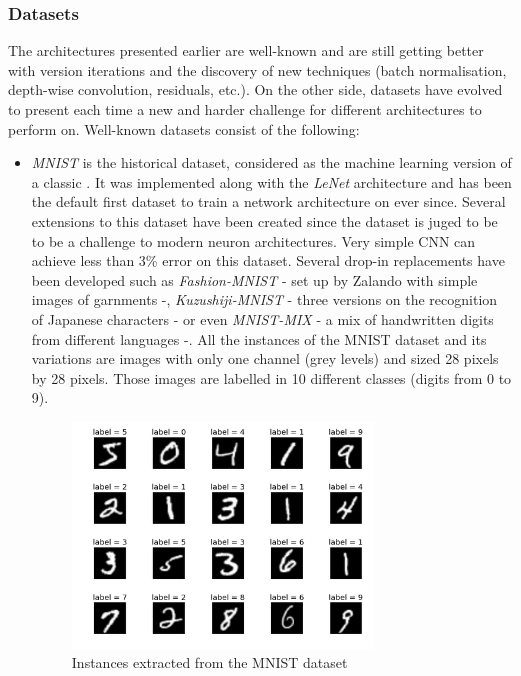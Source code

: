 
\subsubsection{Datasets}

The architectures presented earlier are well-known and are still getting better with version iterations and the discovery of new techniques (batch normalisation, depth-wise convolution, residuals, etc.). On the other side, datasets have evolved to present each time a new and harder challenge for different architectures to perform on. Well-known datasets consist of the following:
\begin{itemize}
  \item \emph{MNIST} is the historical dataset, considered as the machine learning version of a classic . It was implemented along with the \emph{LeNet} architecture and has been the default first dataset to train a network architecture on ever since. Several extensions to this dataset have been created since the dataset is juged to be  to be a challenge to modern neuron architectures. Very simple CNN can achieve less than 3\% error on this dataset. Several drop-in replacements have been developed such as \emph{Fashion-MNIST} \cite{Xiao2017} - set up by Zalando with simple images of garnments -, \emph{Kuzushiji-MNIST} \cite{Clanuwat2018} - three versions on the recognition of Japanese characters - or even \emph{MNIST-MIX} \cite{Jiang2020} - a mix of handwritten digits from different languages -. All the instances of the MNIST dataset and its variations are images with only one channel (grey levels) and sized 28 pixels by 28 pixels. Those images are labelled in 10 different classes (digits from 0 to 9).

  \begin{figure}[htbp]
  	\centering
  		\includegraphics[width=8cm]{Figures/MNIST.png}
  	\caption[MNIST]{Instances extracted from the MNIST dataset}
  	\label{fig:MNIST}
  \end{figure}


\end{itemize}
